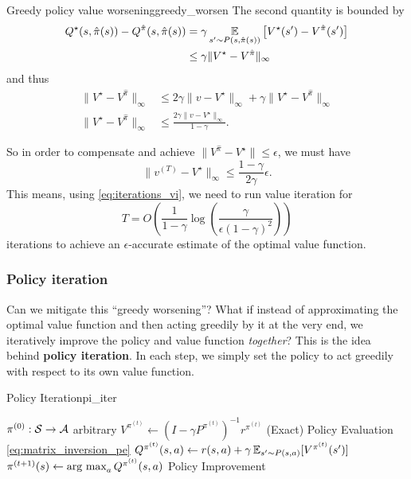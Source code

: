\documentclass[\main/main]{subfiles}
\begin{document}
\begin{theorem}{Greedy policy value worsening}{greedy_worsen}
    The second quantity is bounded by
    \begin{align*}
        Q^{\star}(s, \hat \pi(s)) - Q^{\hat \pi}(s, \hat \pi(s))
        &=
        \gamma \operatorname*{\mathbb{E}}_{s'\sim P(s, \hat \pi(s))}\left[ V^\star(s') - V^{\hat \pi}(s') \right] \\
        & \leq 
        \gamma \|V^{\star} - V^{\hat \pi}\|_\infty
    \end{align*}
    and thus
    \begin{align*}
        \|V^\star - V^{\hat \pi}\|_\infty &\le 2 \gamma \|v - V^{\star}\|_{\infty} + \gamma \|V^{\star} - V^{\hat \pi}\|_\infty \\
        \|V^\star - V^{\hat \pi}\|_\infty &\le \frac{2 \gamma \|v - V^{\star}\|_{\infty}}{1-\gamma}.
    \end{align*}
\end{theorem}

So in order to compensate and achieve $\|V^{\hat \pi} - V^{\star}\| \le \epsilon$, we must have
\[
    \|v^{(T)} - V^\star\|_{\infty} \le \frac{1-\gamma}{2 \gamma} \epsilon.
\]
This means, using \eqref{eq:iterations_vi}, we need to run value iteration for
\[
    T = O\left( \frac{1}{1-\gamma} \log\left(\frac{\gamma}{\epsilon (1-\gamma)^2}\right) \right)
\]
iterations to achieve an $\epsilon$-accurate estimate of the optimal value function.

\subsubsection{Policy iteration}

Can we mitigate this ``greedy worsening''? What if instead of approximating the optimal value function and then acting greedily by it at the very end, we iteratively improve the policy and value function \emph{together}? This is the idea behind \textbf{policy iteration}. In each step, we simply set the policy to act greedily with respect to its own value function.

\begin{definition}{Policy Iteration}{pi_iter}
\begin{algorithmic}
\State $\pi^{(0)} : \mathcal{S} \to \mathcal{A}$ arbitrary
    \State $V^{\pi^{(t)}} \gets (I - \gamma P^{\pi^{(t)}})^{-1} r^{\pi^{(t)}}$
    \Comment (Exact) Policy Evaluation \eqref{eq:matrix_inversion_pe}
    \State $Q^{\pi^{(t)}}(s, a) \gets r(s, a) + \gamma \operatorname*{\mathbb{E}}_{s' \sim P(s, a)} [V^{\pi^{(t)}} (s')]$
    \State $\pi^{(t+1)}(s) \gets \operatorname*{\textrm{arg\ max}}_a Q^{\pi^{(t)}} (s, a)$
    \Comment Policy Improvement
\EndFor
\end{algorithmic}
\end{definition}
\end{document}
